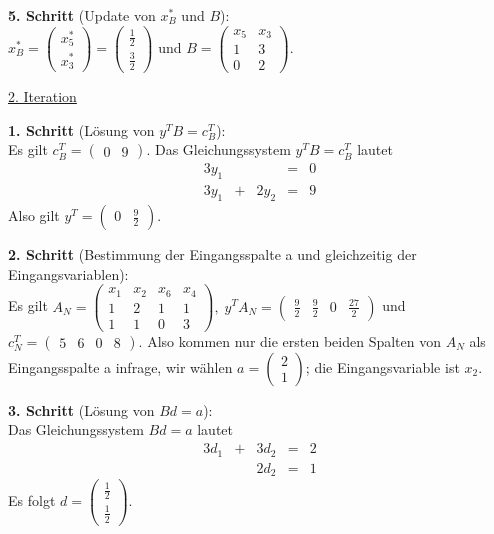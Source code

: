\documentclass[10pt,a4paper,oneside,ngerman,numbers=noenddot]{scrartcl}
\begin{document}
		\textbf{5. Schritt} (Update von $x_{B}^{*}$ und $B$):\\
		$x_{B}^{*} = \begin{pmatrix} x_{5}^{*} \\ x_{3}^{*} \end{pmatrix} = \begin{pmatrix} \frac{1}{2} \\ \frac{3}{2} \end{pmatrix}$ und $B = \begin{pmatrix} x_{5} & x_{3} \\ 1 & 3 \\ 0 & 2 \end{pmatrix}$.
		
		\underline{2. Iteration}
		
		\textbf{1. Schritt} (Lösung von $y^{T}B = c_{B}^{T}$):\\
		Es gilt $c_{B}^{T} = \begin{pmatrix} 0 & 9 \end{pmatrix}$. Das Gleichungssystem $y^{T}B = c_{B}^{T}$ lautet
		\begin{alignat*}{3}
			y_{1} && &=& 0 \\
			3y_{1} &+& 2y_{2} &=& 9
		\end{alignat*}
		Also gilt $y^{T} = \begin{pmatrix} 0 & \frac{9}{2} \end{pmatrix}$.
		
		\textbf{2. Schritt} (Bestimmung der Eingangsspalte a und gleichzeitig der Eingangsvariablen):\\
		Es gilt $A_{N} = \begin{pmatrix} x_{1} & x_{2} & x_{6} & x_{4} \\ 1 & 2 & 1 & 1 \\ 1 & 1 & 0 & 3 \end{pmatrix},\; y^{T}A_{N} = \begin{pmatrix} \frac{9}{2} & \frac{9}{2} & 0 & \frac{27}{2} \end{pmatrix}$ und $c_{N}^{T} = \begin{pmatrix} 5 & 6 & 0 & 8 \end{pmatrix}$. Also kommen nur die ersten beiden Spalten von $A_{N}$ als Eingangsspalte a infrage, wir wählen $a = \begin{pmatrix} 2 \\ 1 \end{pmatrix}$; die Eingangsvariable ist $x_{2}$.
		
		\textbf{3. Schritt} (Lösung von $Bd = a$):\\
		Das Gleichungssystem $Bd = a$ lautet
		\begin{alignat*}{3}
			d_{1} &+& 3d_{2} &=& 2 \\
			&& 2d_{2} &=& 1
		\end{alignat*}
		Es folgt $d = \begin{pmatrix}\frac{1}{2} \\ \frac{1}{2}\end{pmatrix}$.
		
\end{document}
